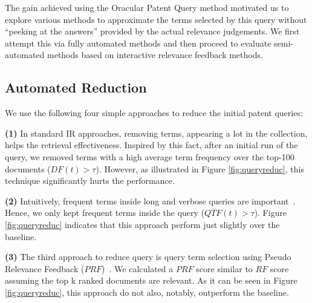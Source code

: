 The gain achieved using the Oracular Patent Query method motivated us to explore various methods to approximate the terms
selected by this query without ``peeking at the answers'' provided by
the actual relevance judgements.  We first attempt this via fully
automated methods and then proceed to evaluate semi-automated methods
based on interactive relevance feedback methods.

\subsection{Automated Reduction}
\label{sec:AutomatedReduction}
%
We use the following four simple approaches to reduce the initial patent queries: 

\vspace*{0.5mm}
\noindent \textbf{(1)} In standard IR approaches, removing terms, appearing a lot in the collection, helps the retrieval effectiveness. Inspired by this fact, after an initial run of the query, we removed terms  with a high average term frequency over the top-100 documents ($DF(t)>\tau$). However, as illustrated in Figure \ref{fig:queryreduc}, this technique significantly hurts the performance.  

\vspace*{0.5mm}
\noindent \textbf{(2)} Intuitively, frequent terms inside long and verbose queries are  important~\cite{maxwell2013compact}. Hence, we only kept frequent terms inside the query ($QTF(t)>\tau$).  Figure \ref{fig:queryreduc} indicates that this approach perform just slightly over the baseline.

\vspace*{0.5mm}
\noindent \textbf{(3)} The third approach to reduce query is query term selection using Pseudo Relevance Feedback ($\mathit{PRF}$)~\cite{Baeza-Yates2011, maxwell2013compact}. We calculated a $\mathit{PRF}$ score similar to $\mathit{RF}$ score assuming the top k ranked documents are relevant. As it can be seen in Figure \ref{fig:queryreduc}, this approach do not also, notably, outperform the baseline. 

